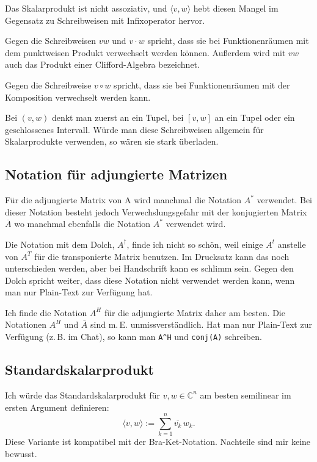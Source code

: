 \documentclass[a4paper,11pt,fleqn,twoside,BCOR=16mm]{scrartcl}
\begin{document}
Das Skalarprodukt ist nicht assoziativ, und $\langle v,w\rangle$
hebt diesen Mangel im Gegensatz zu Schreibweisen mit Infixoperator
hervor.

Gegen die Schreibweisen $vw$ und $v\cdot w$ spricht, dass sie
bei Funktionenräumen mit dem punktweisen Produkt verwechselt
werden können. Außerdem wird mit $vw$ auch das Produkt einer
Clifford-Algebra bezeichnet.

Gegen die Schreibweise $v\circ w$ spricht, dass sie bei
Funktionenräumen mit der Komposition verwechselt werden kann.

Bei $(v,w)$ denkt man zuerst an ein Tupel, bei $[v,w]$
an ein Tupel oder ein geschlossenes Intervall. Würde man diese
Schreibweisen allgemein für Skalarprodukte verwenden, so wären sie
stark überladen.

\subsection{Notation für adjungierte Matrizen}
Für die adjungierte Matrix von A wird manchmal die Notation $A^*$
verwendet. Bei dieser Notation besteht jedoch Verwechslungsgefahr mit
der konjugierten Matrix $\overline{A}$ wo manchmal ebenfalls die
Notation $A^*$ verwendet wird. 

Die Notation mit dem Dolch, $A^\dagger$, finde ich nicht so schön,
weil einige $A^t$ anstelle von $A^T$ für die transponierte Matrix
benutzen. Im Drucksatz kann das noch unterschieden werden,
aber bei Handschrift kann es schlimm sein.
Gegen den Dolch spricht weiter, dass diese Notation nicht
verwendet werden kann, wenn man nur Plain-Text zur Verfügung
hat.

Ich finde die Notation $A^H$ für die adjungierte Matrix daher
am besten. Die Notationen $A^H$ und $\overline{A}$ sind m.\,E.
unmissverständlich. Hat man nur Plain-Text zur Verfügung
(z.\,B. im Chat), so kann man \verb|A^H| und \verb|conj(A)|
schreiben.

\subsection{Standardskalarprodukt}
Ich würde das Standardskalarprodukt für $v,w\in\mathbb C^n$
am besten semilinear im ersten Argument definieren:
\begin{equation}
\langle v,w\rangle := \sum_{k=1}^{n} \overline{v_k}\,w_k.
\end{equation}
Diese Variante ist kompatibel mit der Bra-Ket-Notation.
Nachteile sind mir keine bewusst.
\end{document}
